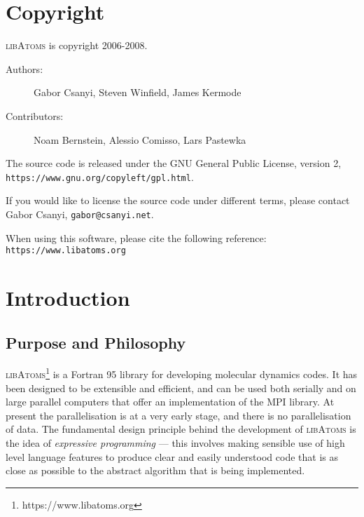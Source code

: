 
\section{Copyright}

\textsc{libAtoms} is copyright 2006-2008.

\begin{description}
\item[Authors:] Gabor Csanyi, Steven Winfield, James Kermode
\item[Contributors:] Noam Bernstein, Alessio Comisso, Lars Pastewka
\end{description}

The source code is released under the GNU General Public License,
version 2, \\ \texttt{https://www.gnu.org/copyleft/gpl.html}.

If you would like to license the source code under different terms,
please contact Gabor Csanyi, \texttt{gabor@csanyi.net}.

When using this software, please cite the following reference:
\texttt{https://www.libatoms.org}

\section{Introduction}

\subsection*{Purpose and Philosophy}

\textsc{libAtoms}\footnote{https://www.libatoms.org} is a Fortran 95
library for developing molecular dynamics codes. It has been designed
to be extensible and efficient, and can be used both serially and on
large parallel computers that offer an implementation of the MPI
library. At present the parallelisation is at a very early stage, and
there is no parallelisation of data. The fundamental design principle
behind the development of \textsc{libAtoms} is the idea of
\emph{expressive programming} --- this involves making sensible use of
high level language features to produce clear and easily understood
code that is as close as possible to the abstract algorithm that is
being implemented.

